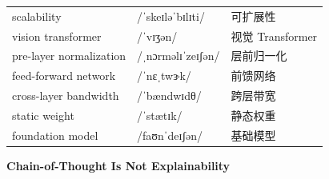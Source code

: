 \documentclass[UTF8,12pt,a4paper]{ctexart}
\providecommand{\zh}[1]{#1}
\begin{document}
\begin{tabular*}{\textwidth}{@{\extracolsep{\fill}}lll@{}}
scalability & {\ipafont /ˈskeɪləˈbɪlɪti/} & \zh{可扩展性} \\
vision transformer & {\ipafont /ˈvɪʒən/} & \zh{视觉 Transformer} \\
pre-layer normalization & {\ipafont /ˌnɔrməlɪˈzeɪʃən/} & \zh{层前归一化} \\
feed-forward network & {\ipafont /ˈnɛˌtwɝk/} & \zh{前馈网络} \\
cross-layer bandwidth & {\ipafont /ˈbændwɪdθ/} & \zh{跨层带宽} \\
static weight & {\ipafont /ˈstætɪk/} & \zh{静态权重} \\
foundation model & {\ipafont /faʊnˈdeɪʃən/} & \zh{基础模型} \\
\bottomrule
\end{tabular*}

\newpage

\begin{center}
    {\Large\bfseries Chain-of-Thought Is Not Explainability}
\end{center}
\end{document}
